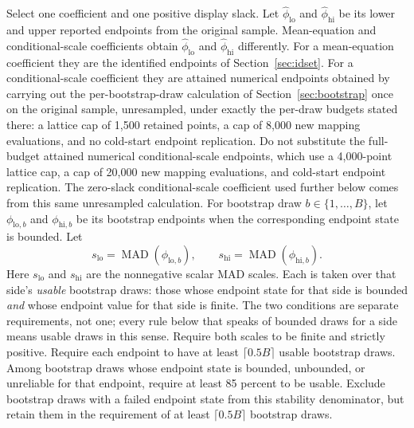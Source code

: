 \documentclass[11pt]{article}
\begin{document}
Select one coefficient and one positive display slack. Let \(\widehat\phi_{\mathrm{lo}}\) and
\(\widehat\phi_{\mathrm{hi}}\) be its lower and upper reported endpoints from the original sample.
Mean-equation and conditional-scale coefficients obtain \(\widehat\phi_{\mathrm{lo}}\) and
\(\widehat\phi_{\mathrm{hi}}\) differently. For a mean-equation coefficient they are the
identified endpoints of Section~\ref{sec:idset}. For a conditional-scale coefficient they are
attained numerical endpoints obtained by carrying out the per-bootstrap-draw calculation of
Section~\ref{sec:bootstrap} once on the original sample, unresampled, under exactly the per-draw
budgets stated there: a lattice cap of 1,500 retained points, a cap of 8,000 new mapping evaluations, and no
cold-start endpoint replication. Do not substitute the full-budget attained numerical
conditional-scale endpoints, which use a 4,000-point lattice cap, a cap of 20,000 new mapping evaluations, and cold-start
endpoint replication. The zero-slack conditional-scale coefficient used further below comes from
this same unresampled calculation. For
bootstrap draw \(b\in\{1,\ldots,B\}\), let \(\phi_{\mathrm{lo},b}\) and \(\phi_{\mathrm{hi},b}\) be its bootstrap
endpoints when the corresponding endpoint state is bounded. Let
\begin{equation*}
 s_{\mathrm{lo}}=\operatorname{MAD}(\phi_{\mathrm{lo},b}),\qquad
 s_{\mathrm{hi}}=\operatorname{MAD}(\phi_{\mathrm{hi},b}).
\end{equation*}
Here \(s_{\mathrm{lo}}\) and \(s_{\mathrm{hi}}\) are the nonnegative scalar MAD scales. Each is
taken over that side's \emph{usable} bootstrap draws: those whose endpoint state for that side is
bounded \emph{and} whose endpoint value for that side is finite. The two conditions are separate
requirements, not one; every rule below that speaks of bounded draws for a side means usable draws in
this sense. Require both scales to be finite and strictly
positive. Require each endpoint to have at least \(\lceil0.5B\rceil\) usable bootstrap draws. Among
bootstrap draws whose endpoint state is bounded, unbounded, or unreliable for that endpoint, require
at least 85 percent to be usable.
Exclude bootstrap draws with a failed endpoint state from this stability denominator, but retain them in the
requirement of at least \(\lceil0.5B\rceil\) bootstrap draws.
\end{document}

